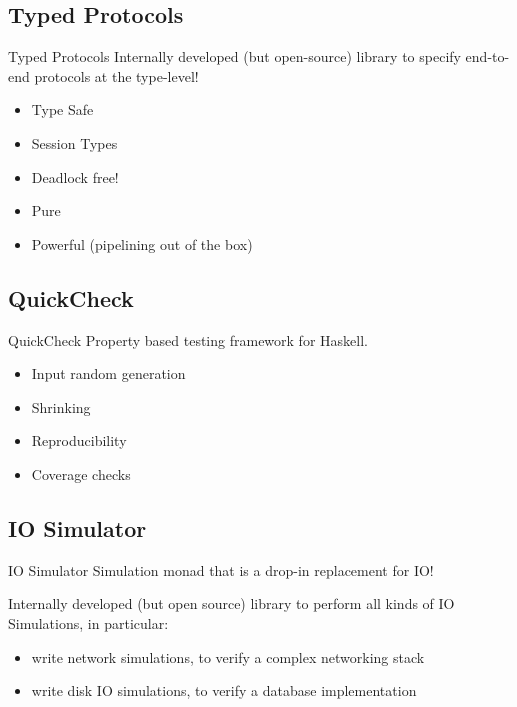 \documentclass{beamer}
\begin{document}
\subsection*{Typed Protocols}

\begin{frame}{Typed Protocols}
  Internally developed (but open-source) library to specify end-to-end protocols at the type-level!

  \begin{itemize}
    \item Type Safe
    \item Session Types
    \item \alert{Deadlock free!}
    \item Pure
    \item Powerful (pipelining out of the box)
  \end{itemize}

\end{frame}

\subsection*{QuickCheck}

\begin{frame}{QuickCheck}
  Property based testing framework for Haskell.

  \begin{itemize}
    \item \alert{Input random generation}
    \item Shrinking
    \item \alert{Reproducibility}
    \item Coverage checks
  \end{itemize}

\end{frame}

\subsection*{IO Simulator}
\begin{frame}{IO Simulator}
  Simulation monad that is a drop-in \alert{replacement} for IO!

  Internally developed (but open source) library to perform all kinds of \alert{IO
  Simulations}, in particular:

  \begin{itemize}
    \item write \alert{network simulations}, to verify a complex networking stack
    \item write \alert{disk IO simulations}, to verify a database implementation
  \end{itemize}
\end{frame}
\end{document}
